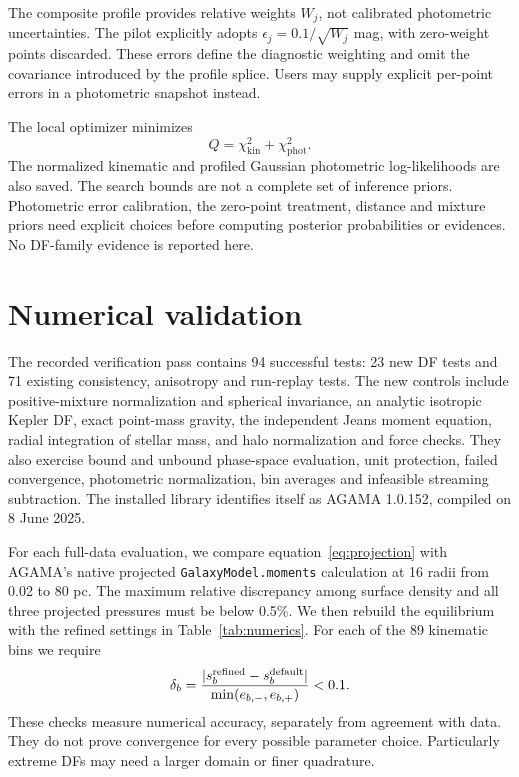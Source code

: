 \documentclass[11pt,a4paper]{article}
\newcommand{\kin}{\mathrm{kin}}
\newcommand{\phot}{\mathrm{phot}}
\begin{document}
The composite profile provides relative weights $W_j$, not calibrated
photometric uncertainties. The pilot explicitly adopts
$\epsilon_j=0.1/\sqrt{W_j}$ mag, with zero-weight points discarded. These
errors define the diagnostic weighting and omit the covariance introduced
by the profile splice. Users may supply explicit per-point errors in a
photometric snapshot instead.

The local optimizer minimizes
\begin{equation}
 Q=\chi^2_\kin+\chi^2_\phot.
 \label{eq:objective}
\end{equation}
The normalized kinematic and profiled Gaussian photometric log-likelihoods
are also saved. The search bounds are not a complete set of inference
priors. Photometric error calibration, the zero-point treatment, distance
and mixture priors need explicit choices before computing posterior
probabilities or evidences. No DF-family evidence is reported here.

\section{Numerical validation}
\label{sec:validation}

The recorded verification pass contains 94 successful tests: 23 new DF tests
and 71 existing consistency, anisotropy and run-replay tests. The new controls
include positive-mixture normalization and spherical invariance, an analytic
isotropic Kepler DF, exact point-mass gravity, the independent Jeans moment
equation, radial integration of stellar mass, and halo normalization and force
checks. They also exercise bound and unbound phase-space evaluation, unit
protection, failed convergence, photometric normalization, bin averages and
infeasible streaming subtraction. The installed library identifies itself as
AGAMA 1.0.152, compiled on 8 June 2025.

For each full-data evaluation, we compare equation~\eqref{eq:projection} with
AGAMA's native projected \texttt{GalaxyModel.moments} calculation at 16 radii
from 0.02 to 80 pc. The maximum relative discrepancy among surface density
and all three projected pressures must be below 0.5\%. We then rebuild the
equilibrium with the refined settings in Table~\ref{tab:numerics}. For each
of the 89 kinematic bins we require
\begin{equation}
 \delta_b=\frac{|s_b^{\rm refined}-s_b^{\rm default}|}
                  {\min(e_{b,-},e_{b,+})}<0.1.
 \label{eq:refine}
\end{equation}
These checks measure numerical accuracy, separately from agreement with data.
They do not prove convergence for every possible parameter choice. Particularly
extreme DFs may need a larger domain or finer quadrature.
\end{document}
